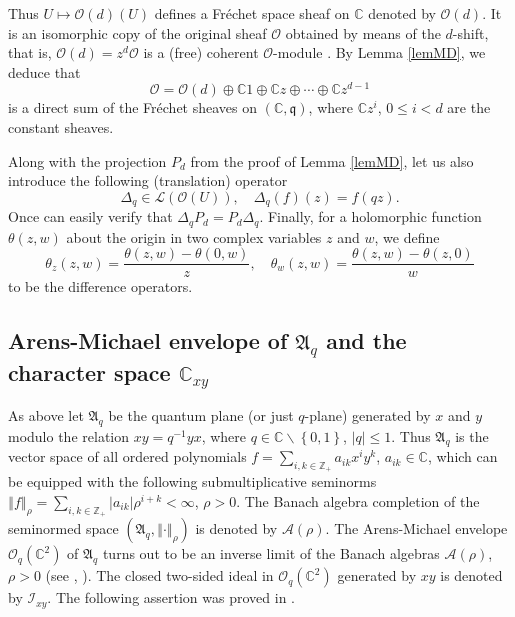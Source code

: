 \documentclass[12pt,reqno]{amsart}%
\theoremstyle{plain}
\numberwithin{theorem}{section} \numberwithin{equation}{section}
\numberwithin{lemma}{section}
\numberwithin{remark}{section}
\numberwithin{example}{section}
\numberwithin{proposition}{section}
\numberwithin{definition}{section}
\numberwithin{corollary}{section}
\begin{document}
Thus $U\mapsto\mathcal{O}\left(  d\right)  \left(  U\right)  $ defines a
Fr\'{e}chet space sheaf on $\mathbb{C}$ denoted by $\mathcal{O}\left(
d\right)  $. It is an isomorphic copy of the original sheaf $\mathcal{O}$
obtained by means of the $d$-shift, that is, $\mathcal{O}\left(  d\right)
=z^{d}\mathcal{O}$ is a (free) coherent $\mathcal{O}$-module \cite[4]{EP}. By
Lemma \ref{lemMD}, we deduce that
\[
\mathcal{O}=\mathcal{O}\left(  d\right)  \oplus\mathbb{C}1\oplus
\mathbb{C}z\oplus\cdots\oplus\mathbb{C}z^{d-1}%
\]
is a direct sum of the Fr\'{e}chet sheaves on $\left(  \mathbb{C}%
,\mathfrak{q}\right)  $, where $\mathbb{C}z^{i}$, $0\leq i<d$ are the constant sheaves.

Along with the projection $P_{d}$ from the proof of Lemma \ref{lemMD}, let us
also introduce the following (translation) operator
\begin{equation}
\Delta_{q}\in\mathcal{L}\left(  \mathcal{O}\left(  U\right)  \right)
,\quad\Delta_{q}\left(  f\right)  \left(  z\right)  =f\left(  qz\right)  .
\label{Delq}%
\end{equation}
Once can easily verify that $\Delta_{q}P_{d}=P_{d}\Delta_{q}$. Finally, for a
holomorphic function $\theta\left(  z,w\right)  $ about the origin in two
complex variables $z$ and $w$, we define
\[
\theta_{z}\left(  z,w\right)  =\frac{\theta\left(  z,w\right)  -\theta\left(
0,w\right)  }{z},\quad\theta_{w}\left(  z,w\right)  =\frac{\theta\left(
z,w\right)  -\theta\left(  z,0\right)  }{w}%
\]
to be the difference operators.

\subsection{Arens-Michael envelope of $\mathfrak{A}_{q}$ and the character
space $\mathbb{C}_{xy}$\label{subsecAMEC}}

As above let $\mathfrak{A}_{q}$ be the quantum plane (or just $q$-plane)
generated by $x$ and $y$ modulo the relation $xy=q^{-1}yx$, where
$q\in\mathbb{C}\backslash\left\{  0,1\right\}  $, $\left\vert q\right\vert
\leq1$. Thus $\mathfrak{A}_{q}$ is the vector space of all ordered polynomials
$f=\sum_{i,k\in\mathbb{Z}_{+}}a_{ik}x^{i}y^{k}$, $a_{ik}\in\mathbb{C}$, which
can be equipped with the following submultiplicative seminorms $\left\Vert
f\right\Vert _{\rho}=\sum_{i,k\in\mathbb{Z}_{+}}\left\vert a_{ik}\right\vert
\rho^{i+k}<\infty$, $\rho>0$. The Banach algebra completion of the seminormed
space $\left(  \mathfrak{A}_{q},\left\Vert \cdot\right\Vert _{\rho}\right)  $
is denoted by $\mathcal{A}\left(  \rho\right)  $. The Arens-Michael envelope
$\mathcal{O}_{q}\left(  \mathbb{C}^{2}\right)  $ of $\mathfrak{A}_{q}$ turns
out to be an inverse limit of the Banach algebras $\mathcal{A}\left(
\rho\right)  $, $\rho>0$ (see \cite{Pir}, \cite{Dosi24}). The closed two-sided
ideal in $\mathcal{O}_{q}\left(  \mathbb{C}^{2}\right)  $ generated by $xy$ is
denoted by $\mathcal{I}_{xy}$. The following assertion was proved in
\cite{Dosi24}.
\end{document}
